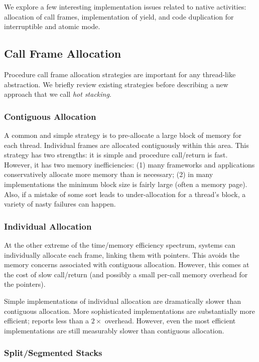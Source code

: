 \documentclass[acmsmall,anonymous,review]{acmart}\settopmatter{printfolios=true,printccs=false,printacmref=false}
\begin{document}
We explore a few interesting implementation issues related to native activities: allocation of call frames, implementation of yield, and code duplication for interruptible and atomic mode.

\subsection{Call Frame Allocation}

Procedure call frame allocation strategies are important for any thread-like abstraction.
We briefly review existing strategies before describing a new approach that we call \emph{hot stacking}.

\subsubsection{Contiguous Allocation}

A common and simple strategy is to pre-allocate a large block of memory for each thread.
Individual frames are allocated contiguously within this area.
This strategy has two strengths: it is simple and procedure call/return is fast.
However, it has two memory inefficiencies: (1) many frameworks and applications conservatively allocate more memory than is necessary; (2) in many implementations the minimum block size is fairly large (often a memory page).
Also, if a mistake of some sort leads to under-allocation for a thread's block, a variety of nasty failures can happen.

\subsubsection{Individual Allocation}

At the other extreme of the time/memory efficiency spectrum, systems can individually allocate each frame, linking them with pointers.
This avoids the memory concerns associated with contiguous allocation.
However, this comes at the cost of slow call/return (and possibly a small per-call memory overhead for the pointers).

Simple implementations of individual allocation are dramatically slower than contiguous allocation.
More sophisticated implementations are substantially more efficient; \cite{Shao2000} reports less than a $2\times$ overhead.
However, even the most efficient implementations are still measurably slower than contiguous allocation.

\subsubsection{Split/Segmented Stacks}
\end{document}
